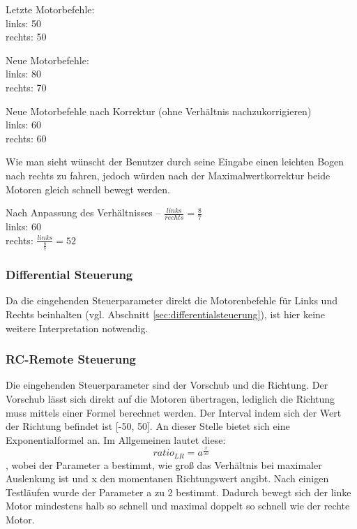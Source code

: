Letzte Motorbefehle: \\
	links: 50 \\
	rechts: 50 
	
Neue Motorbefehle: \\
	links: 80 \\
	rechts: 70 
	
Neue Motorbefehle nach Korrektur (ohne Verhältnis nachzukorrigieren) \\
	links: 60 \\
	rechts: 60 
	
Wie man sieht wünscht der Benutzer durch seine Eingabe einen leichten Bogen nach rechts zu fahren, jedoch würden nach der Maximalwertkorrektur beide Motoren gleich schnell bewegt werden.

Nach Anpassung des Verhältnisses -- $\frac{links}{rechts} = \frac{8}{7}$ \\
	links: 60 \\
	rechts: $\frac{links}{\frac{8}{7}} = 52$


\subsubsection{Differential Steuerung}
Da die eingehenden Steuerparameter direkt die Motorenbefehle für Links und Rechts beinhalten (vgl. Abschnitt \ref{sec:differentialsteuerung}), ist hier keine weitere Interpretation notwendig. 

\subsubsection{RC-Remote Steuerung}
Die eingehenden Steuerparameter sind der Vorschub und die Richtung. Der Vorschub lässt sich direkt auf die Motoren übertragen, lediglich die Richtung muss mittels einer Formel berechnet werden. Der Interval indem sich der Wert der Richtung befindet ist [-50, 50]. An dieser Stelle bietet sich eine Exponentialformel an. 
Im Allgemeinen lautet diese: 
{\Large \[ratio_{LR} = a^{\frac{x}{50}}\]},
wobei der Parameter a bestimmt, wie groß das Verhältnis bei maximaler Auslenkung ist und x den momentanen Richtungswert angibt.
Nach einigen Testläufen wurde der Parameter a zu 2 bestimmt. Dadurch bewegt sich der linke Motor mindestens halb so schnell und maximal doppelt so schnell wie der rechte Motor.

